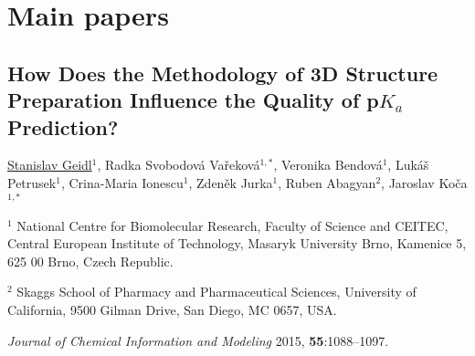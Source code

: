 \chapter{Main papers}
\label{chapter:papers}

\clearpage

\begin{center}
\section{\centering How Does the Methodology of 3D Structure
Preparation Influence the Quality of p$K_a$ Prediction?}
    
\underline{Stanislav Geidl$^1$}, Radka Svobodová Vařeková$^{1, *}$,
Veronika Bendová$^1$, Lukáš Petrusek$^1$, Crina-Maria Ionescu$^1$,
Zdeněk Jurka$^1$, Ruben Abagyan$^2$, Jaroslav Koča$^{1, *}$

\vspace{1cm}

$^1$ National Centre for Biomolecular Research, Faculty of Science and CEITEC,
Central European Institute of Technology, Masaryk University Brno, Kamenice 5,
625 00 Brno, Czech Republic.

$^2$ Skaggs School of Pharmacy and Pharmaceutical Sciences, University of
California, 9500 Gilman Drive, San Diego, MC 0657, USA.

\vspace{1cm}

\textit{Journal of Chemical Information and  Modeling} 2015, \textbf{55}:1088–1097.

\end{center}




